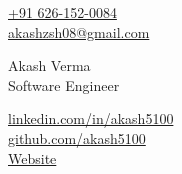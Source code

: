 \documentclass[letterpaper,11pt]{article}
\begin{document}
\setlength{\footskip}{4pt}
\begin{minipage}[b]{0.24\textwidth}
        \small \href{https://wa.me/+916261520084}{+91 626-152-0084} \\
        \small \href{mailto:akashzsh08@gmail.com}{akashzsh08@gmail.com} \vspace{4pt} 
\end{minipage}%
\begin{minipage}[b]{0.5\textwidth}
        \centering
        {\Huge Akash Verma} \\ %
        \vspace{5pt}
        {\Large{Software Engineer} \vspace{5pt}}  \\
\end{minipage}%
\begin{minipage}[b]{0.26\textwidth}
        \flushright \small  %
        {\href{https://www.linkedin.com/in/akash5100/}{linkedin.com/in/akash5100}} \\
        \href{https://github.com/akash5100}{github.com/akash5100} \\
        \href{https://akashverma.vercel.app}{Website} \\
        \vspace{4pt}
\end{minipage}  
    
\end{document}
